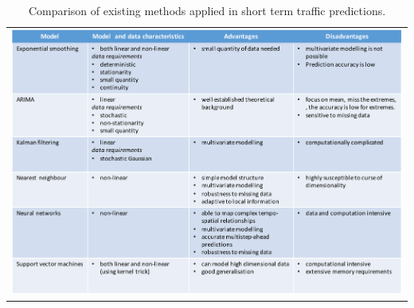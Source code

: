 \begin{table}
    \begin{tabular}{c}
        \includegraphics[width=\textwidth,height=\textheight,keepaspectratio]{Figures/method-comparisons.pdf}
    \end{tabular}
    \caption[Comparison of existing methods]{Comparison of existing methods applied in short term
     traffic predictions.}
    \label{table:comparisonExistingMethods}
\end{table}